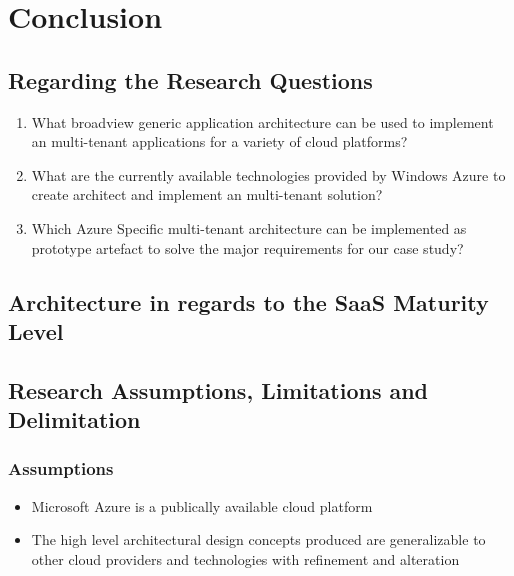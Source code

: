 \chapter{Conclusion}


\section{Regarding the Research Questions}

\begin{enumerate}
\item What broadview generic application architecture can be used to implement an multi-tenant applications for a variety of cloud platforms?
\item What are the currently available technologies provided by Windows Azure to create architect and implement an multi-tenant solution?
\item Which Azure Specific multi-tenant architecture can be implemented as prototype  artefact to solve the major requirements for our case study?
\end{enumerate}

\section{Architecture in regards to the SaaS Maturity Level}

\section{Research Assumptions, Limitations and Delimitation}

\subsection{Assumptions}
\begin{itemize}
\item Microsoft Azure is a publically available cloud platform
\item The high level architectural design concepts produced are generalizable to other cloud providers and technologies with refinement and alteration
\end{itemize}

